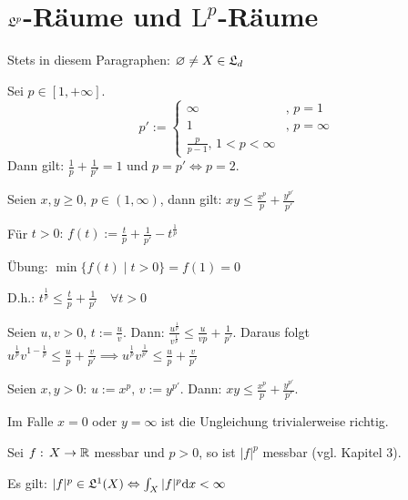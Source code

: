 \documentclass[a4paper,twoside,DIV15,BCOR12mm,chapterprefix=true,headings=onelinechapter]{scrbook}
\begin{document}
\chapter{\(\mathfrak{L}^{p}\)-R\"aume und \(\mathrm{L}^{p}\)-R\"aume}
Stets in diesem Paragraphen: \(\varnothing\neq X\in\mathfrak{L}_{d}\)

\begin{definition}
Sei \(p\in[1,+\infty]\).
\[
p':=\begin{cases}
\infty&,\,p=1\\
1&,\,p=\infty\\
\frac{p}{p-1},\,1<p<\infty
\end{cases}
\]
Dann gilt: \(\frac{1}{p}+\frac{1}{p'}=1\) und \(p=p'\Leftrightarrow p=2\).
\end{definition}

\begin{hilfssatz}
Seien \(x,y\geq 0,\,p\in(1,\infty)\), dann gilt: \(xy\leq\frac{x^{p}}{p}+\frac{y^{p'}}{p'}\)
\end{hilfssatz}
\begin{beweis}
F\"ur \(t>0:\,f(t):=\frac{t}{p}+\frac{1}{p'}-t^{\frac{1}{p}}\)

\"Ubung: \(\min\{f(t)\mid t>0\}=f(1)=0\)

D.h.: \(t^{\frac{1}{p}}\leq\frac{t}{p}+\frac{1}{p'}\quad\forall t>0\)

Seien \(u,v>0,\,t:=\frac{u}{v}\). Dann: \(\frac{u^{\frac{1}{p}}}{v^{\frac{1}{p}}}\leq\frac{u}{vp}+\frac{1}{p'}\). Daraus folgt
\(u^{\frac{1}{p}}v^{1-\frac{1}{p}}\leq\frac{u}{p}+\frac{v}{p'}\implies u^{\frac{1}{p}}v^{\frac{1}{p'}}\leq \frac{u}{p}+\frac{v}{p'}\)

Seien \(x,y>0:\,u:=x^{p},\,v:=y^{p'}\). Dann: \(xy\leq\frac{x^{p}}{p}+\frac{y^{p'}}{p'}\).

Im Falle \(x=0\) oder \(y=\infty\) ist die Ungleichung trivialerweise richtig.
\end{beweis}

\begin{erinnerung}
Sei \(f:\,X\to\mathbb{R}\) messbar und \(p>0\), so ist \(\lvert f\rvert^{p}\) messbar (vgl. Kapitel 3).

Es gilt: \(\lvert f\rvert^{p}\in\mathfrak{L}^{1}(X)\Leftrightarrow \int_{X}{\lvert f\rvert^{p}\mathrm{d}x}<\infty\)
\end{erinnerung}
\end{document}
